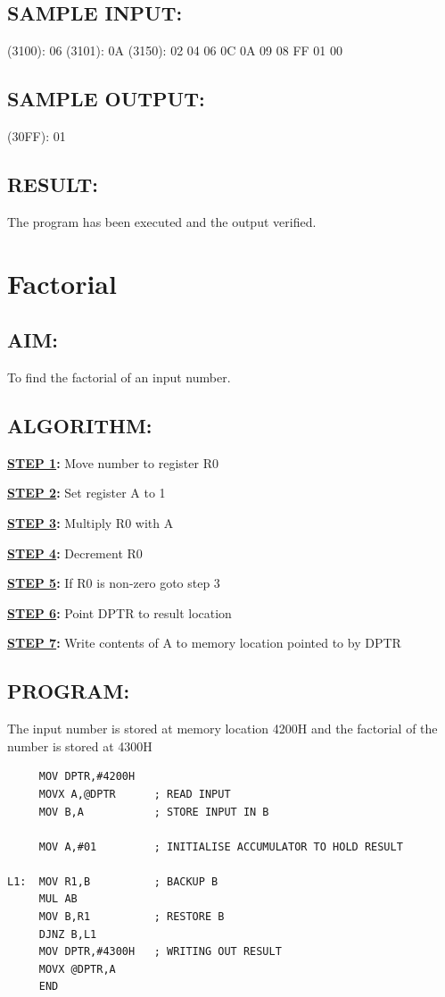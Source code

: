 \documentclass[a4paper,28pt,twoside,openright]{report}
\begin{document}
\section*{SAMPLE INPUT:}
(3100): 06\newline
(3101): 0A\newline
(3150): 02 04 06 0C 0A 09 08 FF 01 00
\section*{SAMPLE OUTPUT:}
(30FF): 01
\section*{RESULT:}
The program has been executed and the output verified.
%
%
%
\chapter{Factorial}
\section*{AIM:}

To find the factorial of an input number.

\section*{ALGORITHM:}
\textbf{\underline{STEP 1}:} Move number to register R0

\textbf{\underline{STEP 2}:} Set register A to 1

\textbf{\underline{STEP 3}:} Multiply R0 with A

\textbf{\underline{STEP 4}:} Decrement R0

\textbf{\underline{STEP 5}:} If R0 is non-zero goto step 3

\textbf{\underline{STEP 6}:} Point DPTR to result location

\textbf{\underline{STEP 7}:} Write contents of A to memory location pointed to by DPTR

\section*{PROGRAM:}
The input number is stored at memory location 4200H and the factorial of the number is stored at 4300H
\begin{lstlisting}
     MOV DPTR,#4200H
     MOVX A,@DPTR      ; READ INPUT
     MOV B,A           ; STORE INPUT IN B
     
     MOV A,#01         ; INITIALISE ACCUMULATOR TO HOLD RESULT
     
L1:  MOV R1,B          ; BACKUP B    
     MUL AB            
     MOV B,R1          ; RESTORE B
     DJNZ B,L1
     MOV DPTR,#4300H   ; WRITING OUT RESULT
     MOVX @DPTR,A
     END
\end{lstlisting}
\end{document}
